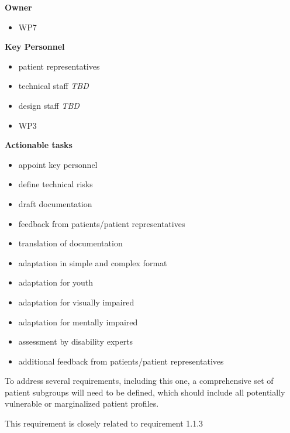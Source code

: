 \documentclass[
  letterpaper,
  DIV=11,
  numbers=noendperiod]{scrreport}
\providecommand{\tightlist}{%
  \setlength{\itemsep}{0pt}\setlength{\parskip}{0pt}}\usepackage{longtable,booktabs,array}
\begin{document}
\textbf{Owner}

\begin{itemize}
\tightlist
\item
  WP7
\end{itemize}

\textbf{Key Personnel}

\begin{itemize}
\tightlist
\item
  patient representatives
\item
  technical staff \emph{TBD}
\item
  design staff \emph{TBD}
\item
  WP3
\end{itemize}

\textbf{Actionable tasks}

\begin{itemize}
\tightlist
\item
  appoint key personnel
\item
  define technical risks
\item
  draft documentation
\item
  feedback from patients/patient representatives
\item
  translation of documentation
\item
  adaptation in simple and complex format
\item
  adaptation for youth
\item
  adaptation for visually impaired
\item
  adaptation for mentally impaired
\item
  assessment by disability experts
\item
  additional feedback from patients/patient representatives
\end{itemize}

\begin{tcolorbox}[enhanced jigsaw, arc=.35mm, breakable, coltitle=black, toptitle=1mm, colbacktitle=quarto-callout-note-color!10!white, toprule=.15mm, left=2mm, bottomrule=.15mm, opacitybacktitle=0.6, titlerule=0mm, colback=white, opacityback=0, title=\textcolor{quarto-callout-note-color}{\faInfo}\hspace{0.5em}{Note}, bottomtitle=1mm, colframe=quarto-callout-note-color-frame, leftrule=.75mm, rightrule=.15mm]

To address several requirements, including this one, a comprehensive set
of patient subgroups will need to be defined, which should include all
potentially vulnerable or marginalized patient profiles.

This requirement is closely related to requirement 1.1.3

\end{tcolorbox}
\end{document}
